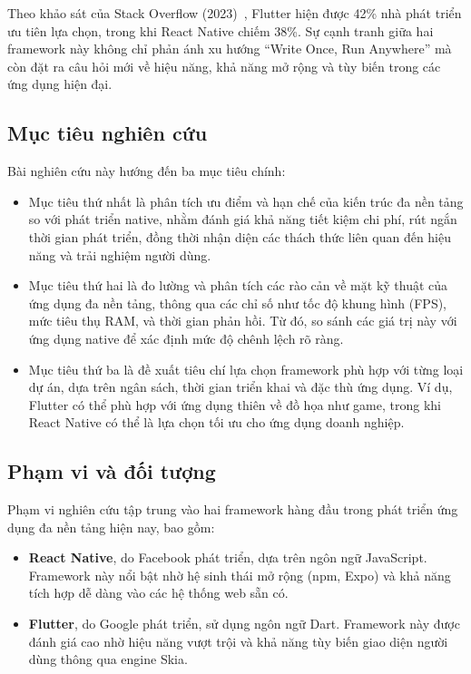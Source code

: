 \begin{flushleft}
    \hspace*{0.8cm}Theo khảo sát của Stack Overflow (2023)~\cite{stackoverflow2023}, Flutter hiện được 42\% nhà phát triển ưu tiên lựa chọn, trong khi React Native chiếm 38\%. Sự cạnh tranh giữa hai framework này không chỉ phản ánh xu hướng ``Write Once, Run Anywhere'' mà còn đặt ra câu hỏi mới về hiệu năng, khả năng mở rộng và tùy biến trong các ứng dụng hiện đại.
\end{flushleft}

\subsection{Mục tiêu nghiên cứu}
\renewcommand{\labelitemi}{--}    
\begin{flushleft}
    \hspace*{0.8cm}Bài nghiên cứu này hướng đến ba mục tiêu chính:
    \setlength{\leftmargini}{1.0cm}
    \begin{itemize}
        \item Mục tiêu thứ nhất là phân tích ưu điểm và hạn chế của kiến trúc đa nền tảng so với phát triển native, nhằm đánh giá khả năng tiết kiệm chi phí, rút ngắn thời gian phát triển, đồng thời nhận diện các thách thức liên quan đến hiệu năng và trải nghiệm người dùng.
        \item Mục tiêu thứ hai là đo lường và phân tích các rào cản về mặt kỹ thuật của ứng dụng đa nền tảng, thông qua các chỉ số như tốc độ khung hình (FPS), mức tiêu thụ RAM, và thời gian phản hồi. Từ đó, so sánh các giá trị này với ứng dụng native để xác định mức độ chênh lệch rõ ràng.
        \item Mục tiêu thứ ba là đề xuất tiêu chí lựa chọn framework phù hợp với từng loại dự án, dựa trên ngân sách, thời gian triển khai và đặc thù ứng dụng. Ví dụ, Flutter có thể phù hợp với ứng dụng thiên về đồ họa như game, trong khi React Native có thể là lựa chọn tối ưu cho ứng dụng doanh nghiệp.
    \end{itemize}
\end{flushleft}

\subsection{Phạm vi và đối tượng}
\renewcommand{\labelitemi}{--}    
\begin{flushleft}
    \hspace*{0.8cm}Phạm vi nghiên cứu tập trung vào hai framework hàng đầu trong phát triển ứng dụng đa nền tảng hiện nay, bao gồm:
    \setlength{\leftmargini}{1.0cm}
    \begin{itemize}
        \item \textbf{React Native}, do Facebook phát triển, dựa trên ngôn ngữ JavaScript. Framework này nổi bật nhờ hệ sinh thái mở rộng (npm, Expo) và khả năng tích hợp dễ dàng vào các hệ thống web sẵn có.
        \item \textbf{Flutter}, do Google phát triển, sử dụng ngôn ngữ Dart. Framework này được đánh giá cao nhờ hiệu năng vượt trội và khả năng tùy biến giao diện người dùng thông qua engine Skia.
    \end{itemize}
\end{flushleft}

